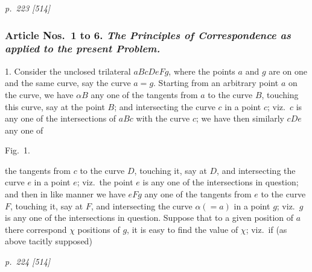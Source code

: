 \documentclass[11pt,a4paper]{article}
\theoremstyle{plain}
\theoremstyle{definition}
\begin{document}
\bigskip
\textit{p.~223 [514]}
\smallskip

\subsubsection*{Article Nos.\ 1 to 6.  \textit{The Principles of Correspondence as applied to the present Problem.}}

1. Consider the unclosed trilateral $aBcDeFg$, where the points $a$ and $g$ are on
one and the same curve, say the curve $a=g$.  Starting from an arbitrary point $a$ on
the curve, we have $\alpha B$ any one of the tangents from $a$ to the curve $B$, touching this
curve, say at the point $B$; and intersecting the curve $c$ in a point $c$; viz.\ $c$ is any one
of the intersections of $aBc$ with the curve $c$; we have then similarly $cDe$ any one of

\begin{center}
Fig.\ 1.\\
\end{center}

the tangents from $c$ to the curve $D$, touching it, say at $D$, and intersecting the curve $e$
in a point $e$; viz.\ the point $e$ is any one of the intersections in question; and then
in like manner we have $eFg$ any one of the tangents from $e$ to the curve $F$, touching
it, say at $F$, and intersecting the curve $\alpha (=a)$ in a point $g$; viz.\ $g$ is any one of
the intersections in question.  Suppose that to a given position of $a$ there correspond
$\chi$ positions of $g$, it is easy to find the value of $\chi$; viz.\ if (as above tacitly supposed)

\clearpage

\bigskip
\textit{p.~224 [514]}
\smallskip
\end{document}

